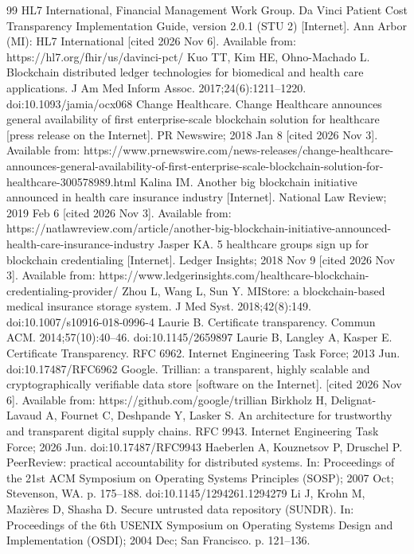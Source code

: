\documentclass[10pt]{article}
\begin{document}
\begin{thebibliography}{99}
 HL7 International, Financial Management Work Group. Da Vinci Patient Cost Transparency Implementation Guide, version 2.0.1 (STU 2) [Internet]. Ann Arbor (MI): HL7 International [cited 2026 Nov 6]. Available from: https://hl7.org/fhir/us/davinci-pct/
 Kuo TT, Kim HE, Ohno-Machado L. Blockchain distributed ledger technologies for biomedical and health care applications. J Am Med Inform Assoc. 2017;24(6):1211--1220. doi:10.1093/jamia/ocx068
 Change Healthcare. Change Healthcare announces general availability of first enterprise-scale blockchain solution for healthcare [press release on the Internet]. PR Newswire; 2018 Jan 8 [cited 2026 Nov 3]. Available from: https://www.prnewswire.com/news-releases/change-healthcare-announces-general-availability-of-first-enterprise-scale-blockchain-solution-for-healthcare-300578989.html
 Kalina IM. Another big blockchain initiative announced in health care insurance industry [Internet]. National Law Review; 2019 Feb 6 [cited 2026 Nov 3]. Available from: https://natlawreview.com/article/another-big-blockchain-initiative-announced-health-care-insurance-industry
 Jasper KA. 5 healthcare groups sign up for blockchain credentialing [Internet]. Ledger Insights; 2018 Nov 9 [cited 2026 Nov 3]. Available from: https://www.ledgerinsights.com/healthcare-blockchain-credentialing-provider/
 Zhou L, Wang L, Sun Y. MIStore: a blockchain-based medical insurance storage system. J Med Syst. 2018;42(8):149. doi:10.1007/s10916-018-0996-4
 Laurie B. Certificate transparency. Commun ACM. 2014;57(10):40--46. doi:10.1145/2659897
 Laurie B, Langley A, Kasper E. Certificate Transparency. RFC 6962. Internet Engineering Task Force; 2013 Jun. doi:10.17487/RFC6962
 Google. Trillian: a transparent, highly scalable and cryptographically verifiable data store [software on the Internet]. [cited 2026 Nov 6]. Available from: https://github.com/google/trillian
 Birkholz H, Delignat-Lavaud A, Fournet C, Deshpande Y, Lasker S. An architecture for trustworthy and transparent digital supply chains. RFC 9943. Internet Engineering Task Force; 2026 Jun. doi:10.17487/RFC9943
 Haeberlen A, Kouznetsov P, Druschel P. PeerReview: practical accountability for distributed systems. In: Proceedings of the 21st ACM Symposium on Operating Systems Principles (SOSP); 2007 Oct; Stevenson, WA. p. 175--188. doi:10.1145/1294261.1294279
 Li J, Krohn M, Mazi\`eres D, Shasha D. Secure untrusted data repository (SUNDR). In: Proceedings of the 6th USENIX Symposium on Operating Systems Design and Implementation (OSDI); 2004 Dec; San Francisco. p. 121--136.

\end{thebibliography}
\end{document}
